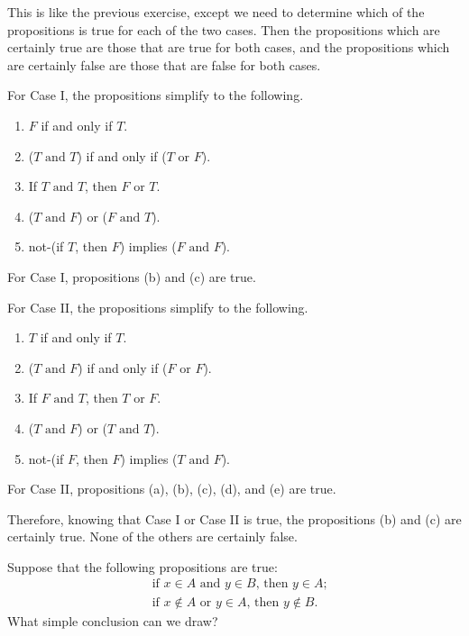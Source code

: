 \documentclass{report}
\renewcommand*{\land}{\text{ and }}
\renewcommand*{\lor}{\text{ or }}
\begin{document}
\begin{solution}
This is like the previous exercise, except we need to determine which of the propositions is true
for each of the two cases. Then the propositions which are certainly true are those that are true for both cases,
and the propositions which are certainly false are those that are false for both cases.

For Case I, the propositions simplify to the following.

\begin{enumerate}[label=(\alph*)]
    \item $F$ if and only if $T$.
    \item ($T\land T$) if and only if ($T\lor F$).
    \item If $T\land T$, then $F\lor T$.
    \item ($T\land F$) or ($F\land T$).
    \item not-(if $T$, then $F$) implies ($F\land F$).
\end{enumerate}

For Case I, propositions (b) and (c) are true.

For Case II, the propositions simplify to the following.

\begin{enumerate}[label=(\alph*)]
    \item $T$ if and only if $T$.
    \item ($T\land F$) if and only if ($F\lor F$).
    \item If $F\land T$, then $T\lor F$.
    \item ($T\land F$) or ($T\land T$).
    \item not-(if $F$, then $F$) implies ($T\land F$).
\end{enumerate}

For Case II, propositions (a), (b), (c), (d), and (e) are true.

Therefore, knowing that Case I or Case II is true,
the propositions (b) and (c) are certainly true. None of the others are certainly false.
\end{solution}

\begin{exercise}
Suppose that the following propositions are true:
\begin{align*}
    &\text{if $x\in A\land y\in B$, then $y\in A$;}\\
    &\text{if $x\nin A\lor y\in A$, then $y\nin B$.}
\end{align*}
What simple conclusion can we draw?
\end{exercise}
\end{document}
